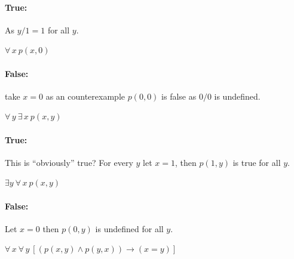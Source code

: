 \documentclass[a4paper, english, 12pt]{article} %
\begin{document}
\begin{answer}
  \paragraph{True:} As $y/1 = 1$ for all $y$.
\end{answer}
    
\begin{subsubproblem}
  $\forall \, x \ p(x, 0)$
\end{subsubproblem}

\begin{answer}
  \paragraph{False:} take $x = 0$ as an counterexample $p(0,0)$ is false as $0/0$ is undefined.
\end{answer}
    
\begin{subsubproblem}[6]
  $\forall \, y \ \exists \,  x \ p(x,y)$
\end{subsubproblem}

\begin{answer}
  \paragraph{True:} This is ``obviously'' true? For every $y$ let $x=1$, then $p(1,y)$ is true for
  all $y$.
\end{answer}
    
\begin{subsubproblem}
  $\exists y \ \forall \, x \ p(x, y)$
\end{subsubproblem}

\begin{answer}
  \paragraph{False: } Let $x = 0$ then $p(0, y)$ is undefined for all $y$.
\end{answer}
    
    
\begin{subsubproblem}
  $\forall \, x \ \forall \, y \ [(p(x, y) \wedge p(y, x)) \to (x = y)]$
\end{subsubproblem}
\end{document}
